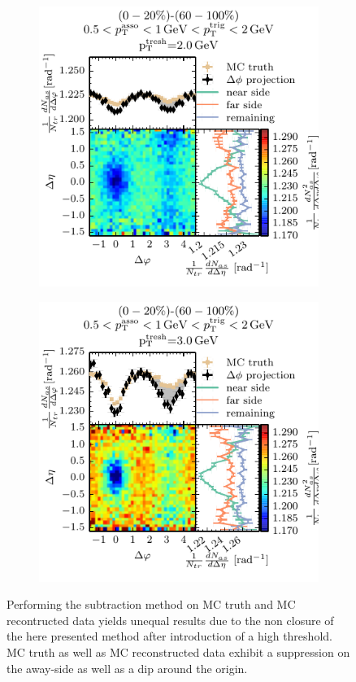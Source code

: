 \begin{figure}
  \centering
  \begin{subfigure}{0.5\textwidth}
    \includegraphics[]{figures/05_12_sub_mc_thresh_20.pdf}
  \end{subfigure}%
  \begin{subfigure}{0.5\textwidth}
    \includegraphics[]{figures/05_12_sub_mc_thresh_30.pdf}   
  \end{subfigure}
  \caption[Performing the subtraction method on MC truth and MC recontructed data when requiring a threshold particle.]{Performing the subtraction method on MC truth and MC recontructed data yields unequal results due to the non closure of the here presented method after introduction of a high \pt threshold. MC truth as well as MC reconstructed data exhibit a suppression on the \gls{away-side} as well as a dip around the origin.}
  \label{fig:subtraction_MC}
\end{figure}


